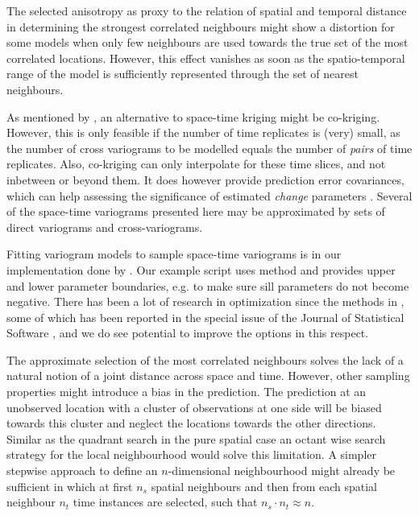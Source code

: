 The selected anisotropy as proxy to the relation of spatial and temporal distance in determining the strongest correlated neighbours might show a distortion for some models when only few neighbours are used towards the true set of the most correlated locations. However, this effect vanishes as soon as the spatio-temporal range of the model is sufficiently represented through the set of nearest neighbours. 

As mentioned by \cite{kj99}, an alternative to space-time kriging might be co-kriging. However, this is only feasible if the number of time replicates is (very) small, as the number of cross variograms to be modelled equals the number of {\em pairs} of time replicates. Also, co-kriging can only interpolate for these time slices, and not inbetween or beyond them. It does however provide prediction error covariances, which can help assessing the significance of estimated {\em change} parameters \citep{pe1,pe2}. Several of the space-time variograms presented here may be approximated by sets of direct variograms and cross-variograms.

Fitting variogram models to sample space-time variograms is in our implementation done by .  Our example script uses method  and provides upper and lower parameter boundaries, e.g. to make sure sill parameters do not become negative. There has been a lot of research in optimization since the methods in , some of which has been reported in the special issue of the Journal of Statistical Software \citep{optim}, and we do see potential to improve the options in this respect.

The approximate selection of the most correlated neighbours solves the lack of a natural notion of a joint distance across space and time. However, other sampling properties might introduce a bias in the prediction. The prediction at an unobserved location with a cluster of observations at one side will be biased towards this cluster and neglect the locations towards the other directions. Similar as the quadrant search in the pure spatial case an octant wise search strategy for the local neighbourhood would solve this limitation. A simpler stepwise approach to define an $n$-dimensional neighbourhood might already be sufficient in which at first $n_s$ spatial neighbours and then from each spatial neighbour $n_t$ time instances are selected, such that $n_s \cdot n_t \approx n$.

